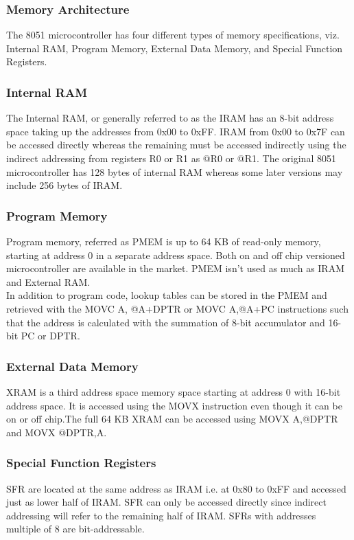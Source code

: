 \documentclass{lab_sheet}
\begin{document}
\subsubsection{Memory Architecture}
The 8051 microcontroller has four different types of memory specifications, viz. Internal RAM, Program Memory, External Data Memory, and Special Function Registers.
\subsubsection*{Internal RAM}
The Internal RAM, or generally referred to as the 
IRAM has an 8-bit address space taking up the addresses from 0x00 to 0xFF. 
IRAM from 0x00 to 0x7F can be accessed directly whereas the remaining must be accessed
 indirectly using the indirect addressing from registers R0 or R1 as @R0 or @R1. 
 The original 8051 microcontroller has 128 bytes of internal RAM whereas some later 
 versions may include 256 bytes of IRAM.
\subsubsection*{Program Memory}
Program memory, referred as PMEM is up to 64 KB of read-only memory, 
starting at address 0 in a separate address space. Both on and off chip versioned
 microcontroller are available in the market.
  PMEM isn't used as much as IRAM and External RAM.\\
  In addition to program code, lookup tables can be stored in the PMEM and 
  retrieved with the MOVC A, @A+DPTR or MOVC A,@A+PC instructions such that 
  the address is calculated with the summation of 8-bit accumulator and 16-bit PC or DPTR.
\subsubsection*{External Data Memory}
XRAM is a third address space memory space starting at address 0 with 16-bit
 address space. It is accessed using the MOVX instruction even though it can 
 be on or off chip.The full 64 KB XRAM can be accessed using MOVX A,@DPTR and MOVX @DPTR,A.
\subsubsection*{Special Function Registers}
SFR are located at the same address as IRAM i.e. at 0x80 to 0xFF and 
accessed just as lower half of IRAM. SFR can only be accessed directly 
since indirect addressing will refer to the remaining half of IRAM. 
SFRs with addresses multiple of 8 are bit-addressable.
\end{document}

